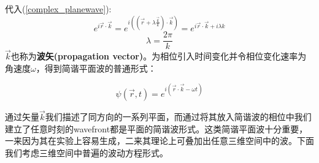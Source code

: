 \documentclass[12pt]{ctexart}%
\begin{document}
代入(\ref{complex_planewave}):
\begin{equation}
    e^{i\vec{r}\cdot\vec{k}}=e^{i((\vec{r}+\lambda \frac{\vec{k}}{k})\cdot\vec{k})}=e^{i\vec{r}\cdot\vec{k}+i\lambda k}
\end{equation}
\begin{equation}
    \lambda=\frac{2\pi}{k}
\end{equation}
$\vec{k}$也称为\textbf{波矢(propagation vector)}。为相位引入时间变化并令相位变化速率为角速度$\omega$，得到简谐平面波的普通形式：
\begin{framed}
    \begin{equation}
        \psi(\vec{r},t)=e^{i(\vec{r}\cdot\vec{k}-\omega t)}
        \label{complex_planewave_2}
    \end{equation}
\end{framed}
\par 通过矢量$\vec{k}$我们描述了同方向的一系列平面，而通过将其放入简谐波的相位中我们建立了任意时刻的wavefront都是平面的简谐波形式。这类简谐平面波十分重要，一来因为其在实验上容易生成，二来其理论上可叠加出任意三维空间中的波。下面我们考虑三维空间中普遍的波动方程形式。
\end{document}
